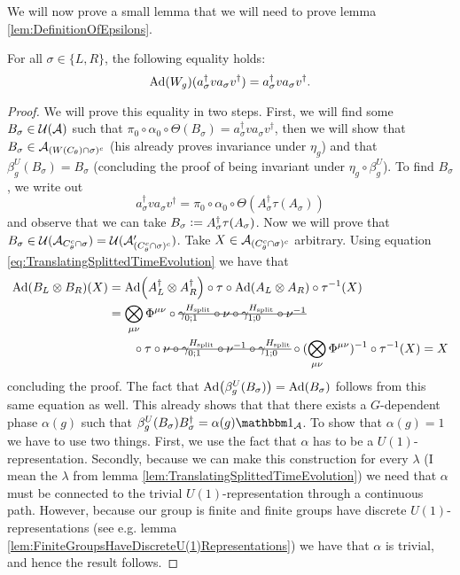 \documentclass[11pt,a4paper,twoside]{article}
\numberwithin{equation}{section}
\begin{document}
	We will now prove a small lemma that we will need to prove lemma \ref{lem:DefinitionOfEpsilons}.
	\begin{lemma}\label{lem:EqualityTwoTranslationsUsingConnectedPath}
		For all $\sigma\in\{L,R\}$, the following equality holds:
		\begin{equation}
			\Ad{W_g}(a_\sigma^\dagger v a_\sigma v^\dagger)=a_\sigma^\dagger v a_\sigma v^\dagger.
		\end{equation}
	\end{lemma}
	\begin{proof}
		We will prove this equality in two steps. First, we will find some $B_\sigma\in\UU(\AA)$ such that $\pi_0\circ\alpha_0\circ\Theta(B_\sigma)=a_\sigma^\dagger v a_\sigma v^\dagger$, then we will show that $B_\sigma\in\AA_{(W(C_\theta)\cap\sigma)^c}$ (his already proves invariance under $\eta_g$) and that $\beta_g^{U}(B_\sigma)=B_\sigma$ (concluding the proof of being invariant under $\eta_g\circ\beta_g^U$). To find $B_\sigma$, we write out                                                                                                                                                                                                              
		\begin{equation}
			a_\sigma^\dagger v a_\sigma v^\dagger=\pi_0\circ\alpha_0\circ\Theta(A_\sigma^\dagger\tau(A_\sigma))
		\end{equation}
		and observe that we can take $B_\sigma \defeq A_\sigma^\dagger\tau(A_\sigma)$. Now we will prove that $B_\sigma\in\UU(\AA_{C_\theta^c\cap\sigma})=\UU(\AA_{(C_\theta^c\cap\sigma)^c}')$. Take $X\in\AA_{(C_\theta^c\cap\sigma)^c}$ arbitrary. Using equation \eqref{eq:TranslatingSplittedTimeEvolution} we have that
		\begin{align}
			\Ad{B_L\otimes B_R}(X)&=\Ad{A_L^\dagger\otimes A_R^\dagger}\circ\tau\circ\Ad{A_L\otimes A_R}\circ\tau^{-1}(X)\\
			&=\bigotimes_{\mu\nu}\Phi^{\mu\nu}\circ\stkout{\gamma^{\Hsplit}_{0;1}\circ\nu\circ \gamma^{\Hsplit}_{1;0}\circ\nu^{-1}}\\
			\nonumber
			&\qquad\circ\tau\circ\stkout{\nu\circ\gamma^{\Hsplit}_{0;1}\circ\nu^{-1}\circ\gamma^{\Hsplit}_{1;0}}\circ(\bigotimes_{\mu\nu}\Phi^{\mu\nu})^{-1}\circ\tau^{-1}(X)=X
		\end{align}
		concluding the proof. The fact that $\Ad{\beta_g^{U}(B_\sigma)}=\Ad{B_\sigma}$ follows from this same equation as well. This already shows that that there exists a $G$-dependent phase $\alpha(g)$ such that $\beta_g^{U}(B_\sigma)B_\sigma^\dagger=\alpha(g)\id_\AA$. To show that $\alpha(g)=1$ we have to use two things. First, we use the fact that $\alpha$ has to be a $U(1)$-representation. Secondly, because we can make this construction for every $\lambda$ (I mean the $\lambda$ from lemma \ref{lem:TranslatingSplittedTimeEvolution}) we need that $\alpha$ must be connected to the trivial $U(1)$-representation through a continuous path. However, because our group is finite and finite groups have discrete $U(1)$-representations (see e.g. lemma \ref{lem:FiniteGroupsHaveDiscreteU(1)Representations}) we have that $\alpha$ is trivial, and hence the result follows.
	\end{proof}
\end{document}
